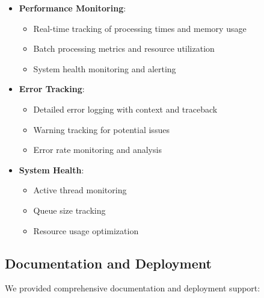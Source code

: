 \documentclass[12pt]{article}
\begin{document}
\begin{itemize}
    \item \textbf{Performance Monitoring}:
    \begin{itemize}
        \item Real-time tracking of processing times and memory usage
        \item Batch processing metrics and resource utilization
        \item System health monitoring and alerting
    \end{itemize}
    
    \item \textbf{Error Tracking}:
    \begin{itemize}
        \item Detailed error logging with context and traceback
        \item Warning tracking for potential issues
        \item Error rate monitoring and analysis
    \end{itemize}
    
    \item \textbf{System Health}:
    \begin{itemize}
        \item Active thread monitoring
        \item Queue size tracking
        \item Resource usage optimization
    \end{itemize}
\end{itemize}

\subsection{Documentation and Deployment}

We provided comprehensive documentation and deployment support:
\end{document}
